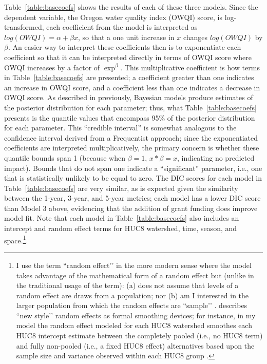 \documentclass[12pt,a4paper,titlepage]{article}
\begin{document}
Table~\ref{table:basecoefs} shows the results of each of these three models. Since the dependent variable, the Oregon water quality index (OWQI) score, is log-transformed, each coefficient from the model is interpreted as $log(OWQI) =\alpha+\beta x$, so that a one unit increase in $x$ changes $log(OWQI)$ by $\beta$. An easier way to interpret these coefficients then is to exponentiate each coefficient so that it can be interpreted directly in terms of OWQI score where OWQI increases by a factor of $\exp^{\beta}$. This multiplicative coefficient is how terms in Table~\ref{table:basecoefs} are presented; a coefficient greater than one indicates an increase in OWQI score, and a coefficient less than one indicates a decrease in OWQI score. As described in previously, Bayesian models produce estimates of the posterior distribution for each parameter; thus, what Table~\ref{table:basecoefs} presents is the quantile values that encompass 95\% of the posterior distribution for each parameter. This “credible interval” \parencite{gelman2013} is somewhat analogous to the confidence interval derived from a Frequentist approach; since the exponentiated coefficients are interpreted multiplicatively, the primary concern is whether these quantile bounds span 1 (because when $\beta=1$, $x*\beta=x$, indicating no predicted impact). Bounds that do not span one indicate a “significant” parameter, i.e., one that is statistically unlikely to be equal to zero. The DIC scores for each model in Table~\ref{table:basecoefs} are very similar, as is expected given the similarity between the 1-year, 3-year, and 5-year metrics; each model has a lower DIC score than Model 3 above, evidencing that the addition of grant funding does improve model fit. Note that each model in Table~\ref{table:basecoefs} also includes an intercept and random effect terms for HUC8 watershed, time, season, and space.\footnote{I use the term ``random effect’’ in the more modern sense where the model takes advantage of the mathematical form of a random effect but (unlike in the traditional usage of the term): (a) does not assume that levels of a random effect are draws from a population; nor (b) am I interested in the larger population from which the random effects are ``sample’’ \parencite[see][]{hodges2014}. \textcite{hodges2014} describes ``new style’’ random effects as formal smoothing devices; for instance, in my model the random effect modeled for each HUC8 watershed smoothes each HUC8 intercept estimate between the completely pooled (i.e., no HUC8 term) and fully non-pooled (i.e., a fixed HUC8 effect) alternatives based upon the sample size and variance observed within each HUC8 group \parencite[see][]{gelman2007}.}.
\end{document}
